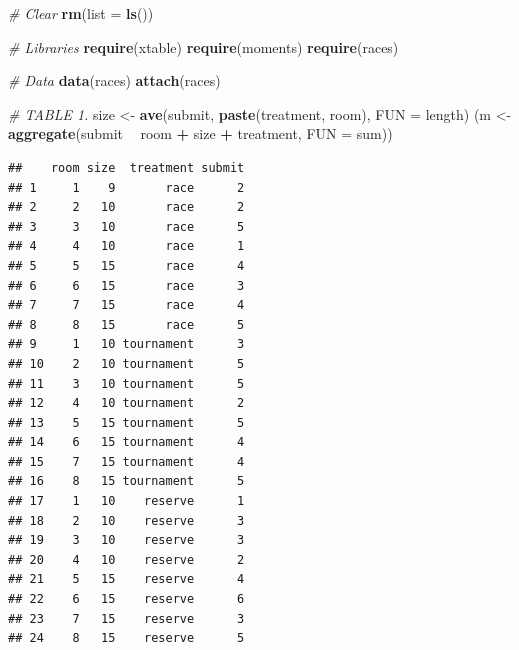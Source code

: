 \documentclass[]{article}
\newenvironment{Shaded}{\begin{snugshade}}{\end{snugshade}}
\newcommand{\KeywordTok}[1]{\textcolor[rgb]{0.13,0.29,0.53}{\textbf{#1}}}
\newcommand{\DataTypeTok}[1]{\textcolor[rgb]{0.13,0.29,0.53}{#1}}
\newcommand{\StringTok}[1]{\textcolor[rgb]{0.31,0.60,0.02}{#1}}
\newcommand{\CommentTok}[1]{\textcolor[rgb]{0.56,0.35,0.01}{\textit{#1}}}
\newcommand{\OperatorTok}[1]{\textcolor[rgb]{0.81,0.36,0.00}{\textbf{#1}}}
\newcommand{\NormalTok}[1]{#1}
\let\oldShaded\Shaded
\let\endoldShaded\endShaded
\renewenvironment{Shaded}{\footnotesize\oldShaded}{\endoldShaded}
\begin{document}
\begin{Shaded}
\begin{Highlighting}[]
\CommentTok{# Clear}
\KeywordTok{rm}\NormalTok{(}\DataTypeTok{list =} \KeywordTok{ls}\NormalTok{())}

\CommentTok{# Libraries}
\KeywordTok{require}\NormalTok{(xtable)}
\KeywordTok{require}\NormalTok{(moments)}
\KeywordTok{require}\NormalTok{(races)}

\CommentTok{# Data}
\KeywordTok{data}\NormalTok{(races)}
\KeywordTok{attach}\NormalTok{(races)}

\CommentTok{# TABLE 1.}
\NormalTok{size <-}\StringTok{ }\KeywordTok{ave}\NormalTok{(submit, }\KeywordTok{paste}\NormalTok{(treatment, room), }\DataTypeTok{FUN =}\NormalTok{ length)}
\NormalTok{(m <-}\StringTok{ }\KeywordTok{aggregate}\NormalTok{(submit }\OperatorTok{~}\StringTok{ }\NormalTok{room }\OperatorTok{+}\StringTok{ }\NormalTok{size }\OperatorTok{+}\StringTok{ }\NormalTok{treatment, }\DataTypeTok{FUN =}\NormalTok{ sum))}
\end{Highlighting}
\end{Shaded}

\begin{verbatim}
##    room size  treatment submit
## 1     1    9       race      2
## 2     2   10       race      2
## 3     3   10       race      5
## 4     4   10       race      1
## 5     5   15       race      4
## 6     6   15       race      3
## 7     7   15       race      4
## 8     8   15       race      5
## 9     1   10 tournament      3
## 10    2   10 tournament      5
## 11    3   10 tournament      5
## 12    4   10 tournament      2
## 13    5   15 tournament      5
## 14    6   15 tournament      4
## 15    7   15 tournament      4
## 16    8   15 tournament      5
## 17    1   10    reserve      1
## 18    2   10    reserve      3
## 19    3   10    reserve      3
## 20    4   10    reserve      2
## 21    5   15    reserve      4
## 22    6   15    reserve      6
## 23    7   15    reserve      3
## 24    8   15    reserve      5
\end{verbatim}
\end{document}
